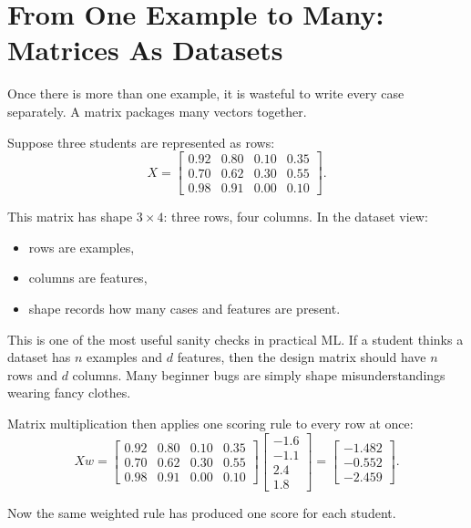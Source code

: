 \section*{From One Example to Many: Matrices As Datasets}

Once there is more than one example, it is wasteful to write every case separately. A matrix packages many vectors together.

Suppose three students are represented as rows:
\[
X =
\begin{bmatrix}
0.92 & 0.80 & 0.10 & 0.35 \\
0.70 & 0.62 & 0.30 & 0.55 \\
0.98 & 0.91 & 0.00 & 0.10
\end{bmatrix}.
\]

This matrix has shape \(3 \times 4\): three rows, four columns. In the dataset view:

\begin{itemize}[leftmargin=*]
\item rows are examples,
\item columns are features,
\item shape records how many cases and features are present.
\end{itemize}

This is one of the most useful sanity checks in practical ML. If a student thinks a dataset has \(n\) examples and \(d\) features, then the design matrix should have \(n\) rows and \(d\) columns. Many beginner bugs are simply shape misunderstandings wearing fancy clothes.

Matrix multiplication then applies one scoring rule to every row at once:
\[
Xw =
\begin{bmatrix}
0.92 & 0.80 & 0.10 & 0.35 \\
0.70 & 0.62 & 0.30 & 0.55 \\
0.98 & 0.91 & 0.00 & 0.10
\end{bmatrix}
\begin{bmatrix}
-1.6 \\
-1.1 \\
2.4 \\
1.8
\end{bmatrix}
=
\begin{bmatrix}
-1.482 \\
-0.552 \\
-2.459
\end{bmatrix}.
\]

Now the same weighted rule has produced one score for each student.

